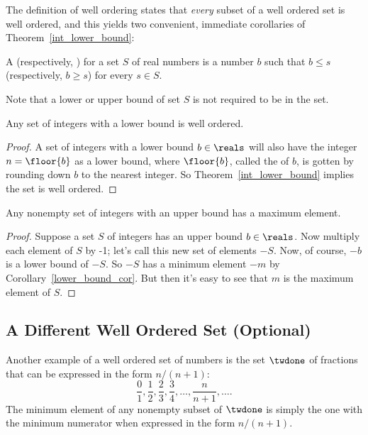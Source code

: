 The definition of well ordering states that \emph{every} subset of a
well ordered set is well ordered, and this yields two convenient,
immediate corollaries of Theorem~\ref{int_lower_bound}:

\begin{definition}
A  (respectively, ) for a set
$S$ of real numbers is a number $b$ such that $b \leq s$
(respectively, $b \geq s$) for every $s \in S$.
\end{definition}
Note that a lower or upper bound of set $S$ is not required to be in
the set.

\begin{corollary}\label{lower_bound_cor}
Any set of integers with a lower bound is well ordered.
\end{corollary}

\begin{proof}
A set of integers with a lower bound $b \in \reals$ will also have the
integer $n = \floor{b}$ as a lower bound, where $\floor{b}$, called
the  of $b$, is gotten by rounding down $b$ to the nearest
integer.  So Theorem~\ref{int_lower_bound} implies the set is well
ordered.
\end{proof}


\begin{corollary}\label{upper_bound_cor}
Any nonempty set of integers with an upper bound has a maximum
element.
\end{corollary}

\begin{proof}
Suppose a set $S$ of integers has an upper bound $b \in \reals$.
Now multiply each element of $S$ by -1; let's call this new set of
elements $-S$.  Now, of course, $-b$ is a lower bound of $-S$.  So
$-S$ has a minimum element $-m$ by Corollary~\ref{lower_bound_cor}.
But then it's easy to see that $m$ is the maximum element of $S$.
\end{proof}


\subsection{A Different Well Ordered Set (Optional)}\label{twdone_sec}

Another example of a well ordered set of numbers is the set $\twdone$ of
fractions that can be expressed in the form $n/(n+1)$:
\[
\frac01, \frac12, \frac23, \frac34, \dots, \frac{n}{n+1}, \dots.
\]
The minimum element of any nonempty subset of $\twdone$ is simply the one
with the minimum numerator when expressed in the form $n/(n+1)$. 

